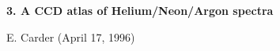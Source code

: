\documentclass[12pt]{article}
\begin{document}
\newpage

\begin{center}
{\large{\bf 3. A CCD atlas of Helium/Neon/Argon spectra}}
\end{center}

\vspace{1cm} 


\centerline{\hspace{-1cm} E. Carder (April 17, 1996)}

\vspace{5cm}

\end{document}
